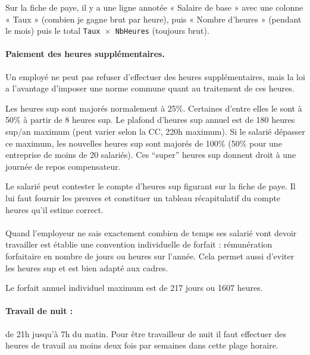 Sur la fiche de paye, il y a une ligne annotée « Salaire de base » avec une colonne « Taux » (combien je gagne brut par heure), puis « Nombre d'heures » (pendant le mois) puis le total \texttt{Taux $\times$ NbHeures} (toujours brut).

\paragraph{Paiement des heures supplémentaires.}
Un employé ne peut pas refuser d'effectuer des heures supplémentaires, mais la loi a l'avantage d'imposer une norme commune quant au traitement de ces heures.

Les heures sup sont majorés normalement à 25\%.
Certaines d’entre elles le sont à 50\% à partir de 8 heures sup.
Le plafond d’heures sup annuel est de 180 heures sup/an maximum (peut varier selon la CC, 220h maximum).
Si le salarié dépasser ce maximum, les nouvelles heures sup sont majorés de 100\% (50\% pour une entreprise de moins de 20 salariés).
Ces “super” heures sup donnent droit à une journée de repos compensateur.

Le salarié peut contester le compte d’heures sup figurant sur la fiche de paye.
Il lui faut fournir les preuves et constituer un tableau récapitulatif du compte heures qu’il estime correct.

\paragraph{}
Quand l’employeur ne sais exactement combien de temps ses salarié vont devoir travailler est établie une convention individuelle de forfait : rémunération forfaitaire en nombre de jours ou heures sur l’année. Cela permet aussi d’eviter les heures sup et est bien adapté aux cadres.

Le forfait annuel individuel maximum est de 217 jours ou 1607 heures.

\paragraph{Travail de nuit :} de 21h jusqu'à 7h du matin.
Pour être travailleur de nuit il faut effectuer des heures de travail au moins deux fois par semaines dans cette plage horaire.

